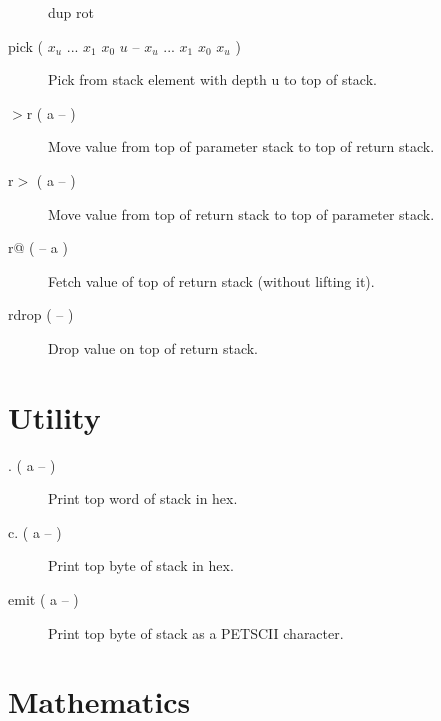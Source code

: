 \begin{description}
dup rot

\item[pick ( $x_u$ ... $x_1$ $x_0$ $u$ -- $x_u$ ... $x_1$ $x_0$ $x_u$ )]

Pick from stack element with depth u to top of stack.

\item[$>$r ( a -- )]

Move value from top of parameter stack to top of return stack. 

\item[r$>$ ( a -- )]

Move value from top of return stack to top of parameter stack. 

\item[r@ ( -- a )]

Fetch value of top of return stack (without lifting it).

\item[rdrop ( -- )]

Drop value on top of return stack.

\end{description}

\section{Utility}

\begin{description}
\item[. ( a -- )]

Print top word of stack in hex.

\item[c. ( a -- )]

Print top byte of stack in hex.

\item[emit ( a -- )]

Print top byte of stack as a PETSCII character.

\end{description}

\section{Mathematics}

